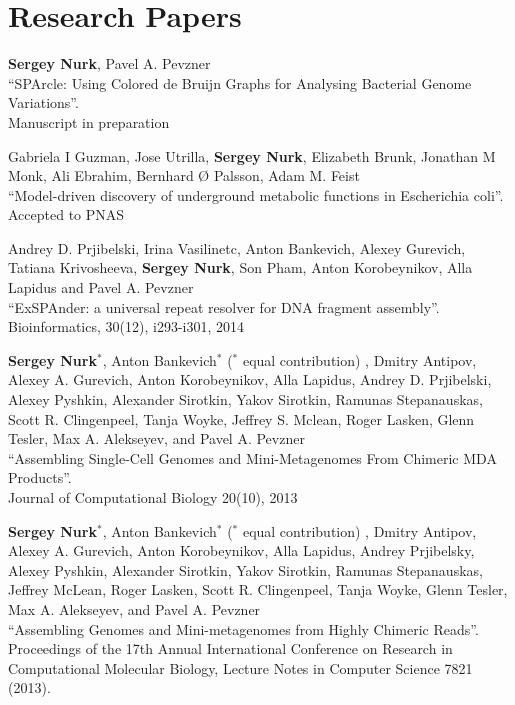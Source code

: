 \section{Research Papers}
%
\begin{innerlist}
\item 
\textbf{Sergey Nurk}, Pavel A. Pevzner\\
``SPArcle: Using Colored de Bruijn Graphs for Analysing Bacterial Genome Variations''. \\
Manuscript in preparation

\blankline

\item Gabriela I Guzman, Jose Utrilla, \textbf{Sergey Nurk}, Elizabeth Brunk, Jonathan M Monk, Ali Ebrahim, Bernhard Ø Palsson, Adam M. Feist\\
``Model-driven discovery of underground metabolic functions in Escherichia coli''. \\
Accepted to PNAS

\blankline

\item Andrey D. Prjibelski, Irina Vasilinetc, Anton Bankevich, Alexey Gurevich, Tatiana Krivosheeva, \textbf{Sergey Nurk}, Son Pham, Anton Korobeynikov, Alla Lapidus and Pavel A. Pevzner\\
``ExSPAnder: a universal repeat resolver for DNA fragment assembly''. \\
Bioinformatics, 30(12), i293-i301, 2014

\blankline

\item \textbf{Sergey Nurk}$^*$, Anton Bankevich$^*$ ($^*$ equal contribution)%
, Dmitry Antipov, Alexey A. Gurevich, Anton Korobeynikov, Alla Lapidus, Andrey D. Prjibelski, Alexey Pyshkin, Alexander Sirotkin, Yakov Sirotkin, Ramunas Stepanauskas, Scott R. Clingenpeel, Tanja Woyke, Jeffrey S. Mclean, Roger Lasken, Glenn Tesler, Max A. Alekseyev, and Pavel A. Pevzner \\
``Assembling Single-Cell Genomes and Mini-Metagenomes From Chimeric MDA Products''. \\
Journal of Computational Biology 20(10), 2013

\blankline

\item \textbf{Sergey Nurk}$^*$, Anton Bankevich$^*$ ($^*$ equal contribution)%
, Dmitry Antipov, Alexey A. Gurevich, Anton Korobeynikov, Alla Lapidus, Andrey Prjibelsky, Alexey Pyshkin, Alexander Sirotkin, Yakov Sirotkin, Ramunas Stepanauskas, Jeffrey McLean, Roger Lasken, Scott R. Clingenpeel, Tanja Woyke, Glenn Tesler, Max A. Alekseyev, and Pavel A. Pevzner \\
``Assembling Genomes and Mini-metagenomes from Highly Chimeric Reads''. \\
Proceedings of the 17th Annual International Conference on Research in Computational Molecular Biology, Lecture Notes in Computer Science 7821 (2013).


\end{innerlist}
